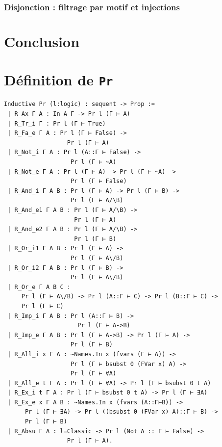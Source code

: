 \documentclass[a4paper]{article}
\theoremstyle{remark}
\theoremstyle{remark}
\theoremstyle{remark}
\theoremstyle{definition}
\theoremstyle{definition}
\theoremstyle{definition}
\begin{document}
\subsubsection{Disjonction : filtrage par motif et injections}


\section{Conclusion}




\nocite{*}


\appendix
\newpage



\section{Définition de \texttt{Pr}} \label{pr}

\begin{verbatim}
Inductive Pr (l:logic) : sequent -> Prop :=
 | R_Ax Γ A : In A Γ -> Pr l (Γ ⊢ A)
 | R_Tr_i Γ : Pr l (Γ ⊢ True)
 | R_Fa_e Γ A : Pr l (Γ ⊢ False) ->
                  Pr l (Γ ⊢ A)
 | R_Not_i Γ A : Pr l (A::Γ ⊢ False) ->
                   Pr l (Γ ⊢ ~A)
 | R_Not_e Γ A : Pr l (Γ ⊢ A) -> Pr l (Γ ⊢ ~A) ->
                   Pr l (Γ ⊢ False)
 | R_And_i Γ A B : Pr l (Γ ⊢ A) -> Pr l (Γ ⊢ B) ->
                   Pr l (Γ ⊢ A/\B)
 | R_And_e1 Γ A B : Pr l (Γ ⊢ A/\B) ->
                    Pr l (Γ ⊢ A)
 | R_And_e2 Γ A B : Pr l (Γ ⊢ A/\B) ->
                    Pr l (Γ ⊢ B)
 | R_Or_i1 Γ A B : Pr l (Γ ⊢ A) ->
                   Pr l (Γ ⊢ A\/B)
 | R_Or_i2 Γ A B : Pr l (Γ ⊢ B) ->
                   Pr l (Γ ⊢ A\/B)
 | R_Or_e Γ A B C :
     Pr l (Γ ⊢ A\/B) -> Pr l (A::Γ ⊢ C) -> Pr l (B::Γ ⊢ C) ->
     Pr l (Γ ⊢ C)
 | R_Imp_i Γ A B : Pr l (A::Γ ⊢ B) ->
                     Pr l (Γ ⊢ A->B)
 | R_Imp_e Γ A B : Pr l (Γ ⊢ A->B) -> Pr l (Γ ⊢ A) ->
                   Pr l (Γ ⊢ B)
 | R_All_i x Γ A : ~Names.In x (fvars (Γ ⊢ A)) ->
                   Pr l (Γ ⊢ bsubst 0 (FVar x) A) ->
                   Pr l (Γ ⊢ ∀A)
 | R_All_e t Γ A : Pr l (Γ ⊢ ∀A) -> Pr l (Γ ⊢ bsubst 0 t A)
 | R_Ex_i t Γ A : Pr l (Γ ⊢ bsubst 0 t A) -> Pr l (Γ ⊢ ∃A)
 | R_Ex_e x Γ A B : ~Names.In x (fvars (A::Γ⊢B)) ->
      Pr l (Γ ⊢ ∃A) -> Pr l ((bsubst 0 (FVar x) A)::Γ ⊢ B) ->
      Pr l (Γ ⊢ B)
 | R_Absu Γ A : l=Classic -> Pr l (Not A :: Γ ⊢ False) ->
                  Pr l (Γ ⊢ A).
\end{verbatim}
\end{document}
